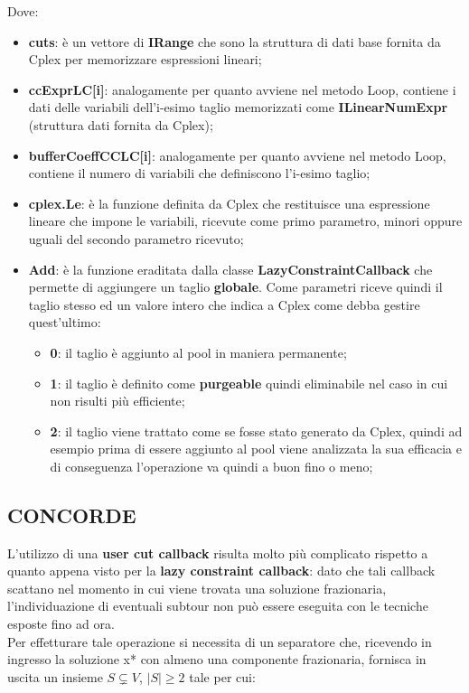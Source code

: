 \documentclass[11pt]{article}
\begin{document}
Dove:

\begin{itemize}
    \item \textbf{cuts}: è un vettore di \textbf{IRange} che sono la struttura di dati base fornita da Cplex per memorizzare espressioni lineari;
    \item \textbf{ccExprLC[i]}: analogamente per quanto avviene nel metodo Loop, contiene i dati delle variabili dell'i-esimo taglio memorizzati come \textbf{ILinearNumExpr} (struttura dati fornita da Cplex);
    \item \textbf{bufferCoeffCCLC[i]}: analogamente per quanto avviene nel metodo Loop, contiene il numero di variabili che definiscono l'i-esimo taglio;
    \item \textbf{cplex.Le}: è la funzione definita da Cplex che restituisce una espressione lineare che impone le variabili, ricevute come primo parametro, minori oppure uguali del secondo parametro ricevuto;
    \item \textbf{Add}: è la funzione eraditata dalla classe \textbf{LazyConstraintCallback} che permette di aggiungere un taglio \textbf{globale}. Come parametri riceve quindi il taglio stesso ed un valore intero che indica a Cplex come debba gestire quest'ultimo:
    \begin{itemize}
        \item \textbf{0}: il taglio è aggiunto al pool in maniera permanente;
        \item \textbf{1}: il taglio è definito come \textbf{purgeable} quindi eliminabile nel caso in cui non risulti più efficiente;
        \item \textbf{2}: il taglio viene trattato come se fosse stato generato da Cplex, quindi ad esempio prima di essere aggiunto al pool viene analizzata la sua efficacia e di conseguenza l'operazione va quindi a buon fino o meno;
    \end{itemize}

\end{itemize}

\subsection*{CONCORDE}

L'utilizzo di una \textbf{user cut callback} risulta molto più complicato rispetto a quanto appena visto per la \textbf{lazy constraint callback}: dato che tali callback scattano nel momento in cui viene trovata una soluzione frazionaria, l'individuazione di eventuali subtour non può essere eseguita con le tecniche esposte fino ad ora.\\
Per effetturare tale operazione si necessita di un separatore che, ricevendo in ingresso la soluzione x* con almeno una componente frazionaria, fornisca in uscita un insieme $S\subsetneq{V}$, $|S|\geq{2}$ tale per cui:
\end{document}
